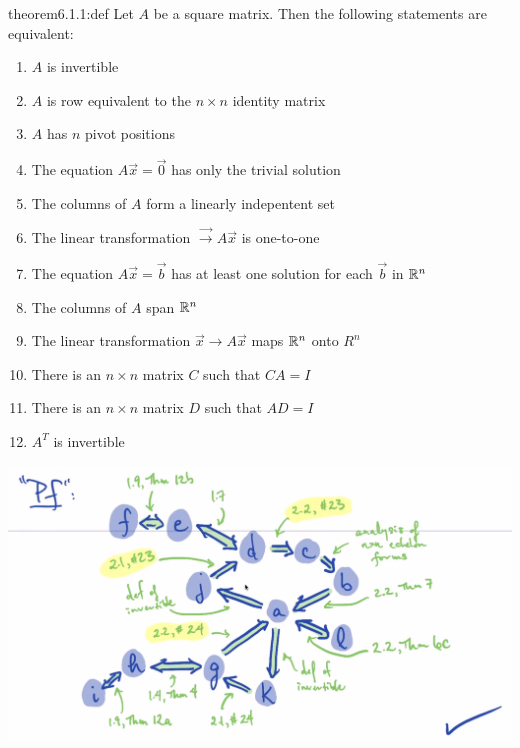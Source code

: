 \begin{theorem}{theorem6.1.1:def}
    Let $A$ be a square matrix. Then the following statements are equivalent:

    \begin{enumerate}
        \item $A$ is invertible
        \item $A$ is row equivalent to the $n\times n$ identity matrix
        \item $A$ has $n$ pivot positions
        \item The equation $A\vec{x} = \vec{0}$ has only the trivial solution
        \item The columns of $A$ form a linearly indepentent set
        \item The linear transformation $\vec \rightarrow A\vec{x}$ is one-to-one
        \item The equation $A\vec{x} = \vec{b}$ has at least one solution for each $\vec{b}$ in $\mathbb{R}^n$
        \item The columns of $A$ span $\mathbb{R}^n$
        \item The linear transformation $\vec{x} \rightarrow A\vec{x}$ maps $\mathbb{R}^n$ onto $R^n$
        \item There is an $n\times n$ matrix $C$ such that $CA = I$
        \item There is an $n\times n$ matrix $D$ such that $AD = I$
        \item $A^T$ is invertible
    \end{enumerate}
\end{theorem}

    \begin{center}
        \includegraphics[width=1\textwidth]{chapters/ch6/images/fig6.1.PNG}
    \end{center}


